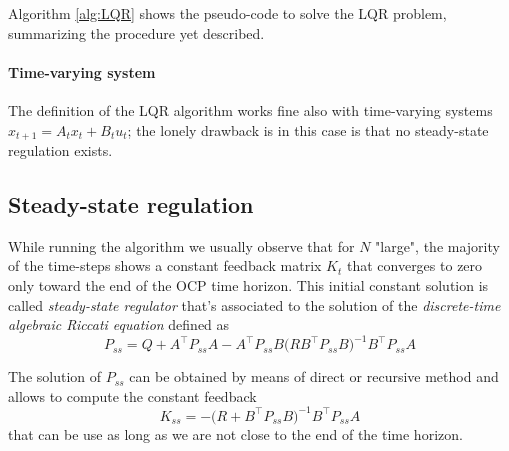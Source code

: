 	
	Algorithm \ref{alg:LQR} shows the pseudo-code to solve the LQR problem, summarizing the procedure yet described.
	
	\paragraph{Time-varying system} The definition of the LQR algorithm works fine also with time-varying systems $x_{t+1} = A_t x_t + B_t u_t$; the lonely drawback is in this case is that no steady-state regulation exists.
	
\subsection{Steady-state regulation}
	While running the algorithm we usually observe that for $N$ "large", the majority of the time-steps shows a constant feedback matrix $K_t$ that converges to zero only toward the end of the OCP time horizon. This initial constant solution is called \textit{steady-state regulator} that's associated to the solution of the \textit{discrete-time algebraic Riccati equation} defined as
	\begin{equation}
		P_{ss} = Q + A^\top P_{ss} A - A^\top P_{ss} B \big(RB^\top P_{ss}B\big)^{-1} B^\top P_{ss} A
	\end{equation}
	
	The solution of $P_{ss}$ can be obtained by means of direct or recursive method and allows to compute the constant feedback 
	\[ K_{ss} = -\big(R + B^\top P_{ss} B\big)^{-1} B^\top P_{ss}A \]
	that can be use as long as we are not close to the end of the time horizon.

